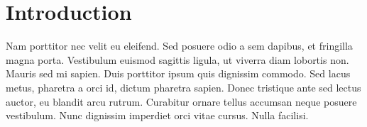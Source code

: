 \section{Introduction}

Nam porttitor nec velit eu eleifend. Sed posuere odio a sem dapibus, et fringilla magna porta. Vestibulum euismod sagittis ligula, ut viverra diam lobortis non. Mauris sed mi sapien. Duis porttitor ipsum quis dignissim commodo. Sed lacus metus, pharetra a orci id, dictum pharetra sapien. Donec tristique ante sed lectus auctor, eu blandit arcu rutrum. Curabitur ornare tellus accumsan neque posuere vestibulum. Nunc dignissim imperdiet orci vitae cursus. Nulla facilisi.